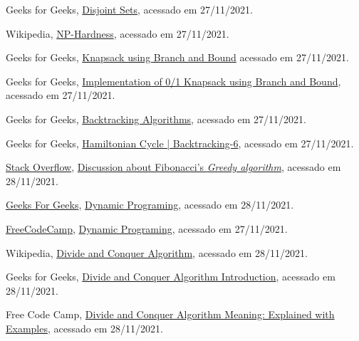 \begin{thebibliography}{10}

  Geeks for Geeks,
  \href{https://www.geeksforgeeks.org/disjoint-set-data-structures/}{Disjoint Sets},
  acessado em 27/11/2021.

  Wikipedia,
  \href{https://en.wikipedia.org/wiki/NP-hardness}{NP-Hardness},
  acessado em 27/11/2021.
  
  Geeks for Geeks,
  \href{https://www.geeksforgeeks.org/0-1-knapsack-using-branch-and-bound/}{Knapsack using Branch and Bound}
  acessado em 27/11/2021.
  
  Geeks for Geeks,
  \href{https://www.geeksforgeeks.org/implementation-of-0-1-knapsack-using-branch-and-bound/}{Implementation of 0/1 Knapsack using Branch and Bound},
  acessado em 27/11/2021.
  
  Geeks for Geeks,
  \href{https://www.geeksforgeeks.org/backtracking-algorithms/#standard}{Backtracking Algorithms},
  acessado em 27/11/2021.

  Geeks for Geeks,
  \href{https://www.geeksforgeeks.org/hamiltonian-cycle-backtracking-6/}{Hamiltonian Cycle | Backtracking-6},
  acessado em 27/11/2021.


  \href{https://stackoverflow.com/}{Stack Overflow},
  \href{https://stackoverflow.com/questions/52869474/implementing-fibonacci-series-using-greedy-approach}{Discussion about Fibonacci's \emph{Greedy algorithm}},
  acessado em 28/11/2021. 

  \href{https://www.geeksforgeeks.org/}{Geeks For Geeks},
  \href{https://www.geeksforgeeks.org/dynamic-programming/}{Dynamic Programing},
  acessado em 28/11/2021.
  
  \href{https://www.freecodecamp.org}{FreeCodeCamp},
  \href{https://youtu.be/oBt53YbR9Kk?t=210}{Dynamic Programing},
  acessado em 27/11/2021.

  Wikipedia,
  \href{https://en.wikipedia.org/wiki/Divide-and-conquer_algorithm}{Divide and Conquer Algorithm},
  acessado em 28/11/2021.

  Geeks for Geeks,
  \href{https://www.geeksforgeeks.org/divide-and-conquer-algorithm-introduction/}{Divide and Conquer Algorithm Introduction},
  acessado em 28/11/2021.

  Free Code Camp,
  \href{https://www.freecodecamp.org/news/divide-and-conquer-algorithms/}{Divide and Conquer Algorithm Meaning: Explained with Examples},
  acessado em 28/11/2021.

\end{thebibliography}